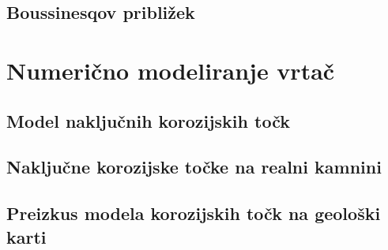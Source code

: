 \documentclass[a4paper, oneside, 12pt]{book}
\begin{document}
\section{Boussinesqov približek}


\chapter{Numerično modeliranje vrtač} 
\label{ch3}

\section{Model naključnih korozijskih točk}
\section{Naključne korozijske točke na realni kamnini}
\section{Preizkus modela korozijskih točk na geološki karti}

\nocite{*}
\newpage
{}

\end{document}
